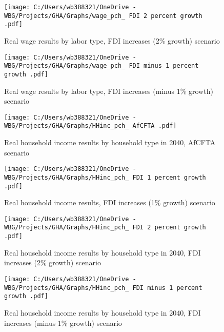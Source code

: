 \documentclass[11pt,english]{article}
\begin{document}
\begin{figure}[ht!]\caption{Real wage results by labor type, FDI increases (2\% growth) scenario}  \label{fig_FDI2_wage_pch}
	\centering
	\texttt{[image: C:/Users/wb388321/OneDrive - WBG/Projects/GHA/Graphs/wage\_pch\_ FDI 2 percent growth .pdf]}
\end{figure}


\begin{figure}[ht!]\caption{Real wage results by labor type, FDI increases (minus 1\% growth) scenario}  \label{fig_FDI1n_wage_pch}
	\centering
	\texttt{[image: C:/Users/wb388321/OneDrive - WBG/Projects/GHA/Graphs/wage\_pch\_ FDI minus 1 percent growth .pdf]}
\end{figure}


\begin{figure}[ht!]\caption{Real household income results by household type in 2040, AfCFTA scenario} \label{fig_AFT1_HHinc_pch}
	\centering
	\texttt{[image: C:/Users/wb388321/OneDrive - WBG/Projects/GHA/Graphs/HHinc\_pch\_ AfCFTA .pdf]}
\end{figure}

\begin{figure}[ht!]\caption{Real household income results, FDI increases (1\% growth) scenario} \label{fig_FDI1_HHinc_pch}
	\centering
	\texttt{[image: C:/Users/wb388321/OneDrive - WBG/Projects/GHA/Graphs/HHinc\_pch\_ FDI 1 percent growth .pdf]}
\end{figure}

\begin{figure}[ht!]\caption{Real household income results by household type in 2040, FDI increases (2\% growth) scenario} \label{fig_FDI2_HHinc_pch}
	\centering
	\texttt{[image: C:/Users/wb388321/OneDrive - WBG/Projects/GHA/Graphs/HHinc\_pch\_ FDI 2 percent growth .pdf]}
\end{figure}

\begin{figure}[ht!]\caption{Real household income results by household type in 2040, FDI increases (minus 1\% growth) scenario} \label{fig_FDI1n_HHinc_pch}
	\centering
	\texttt{[image: C:/Users/wb388321/OneDrive - WBG/Projects/GHA/Graphs/HHinc\_pch\_ FDI minus 1 percent growth .pdf]}
\end{figure}
\end{document}
